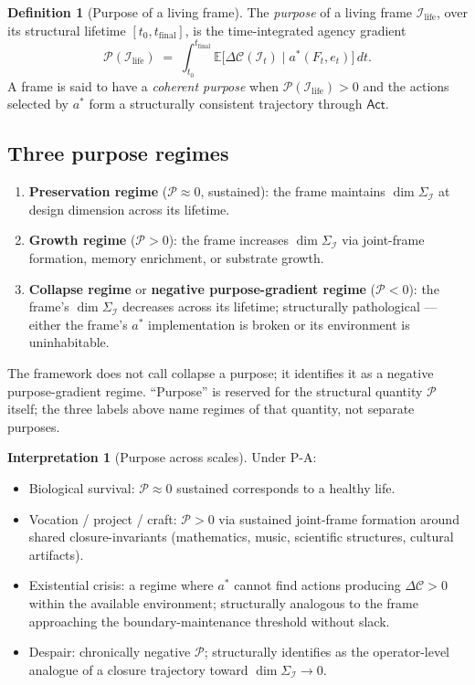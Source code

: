 \documentclass[11pt]{article}
\theoremstyle{plain}
\theoremstyle{definition}
\newtheorem{definition}[theorem]{Definition}
\newtheorem{interpretation}[theorem]{Interpretation}
\theoremstyle{remark}
\newcommand{\Ical}{\mathcal{I}}
\newcommand{\Ccal}{\mathcal{C}}
\newcommand{\Pcal}{\mathcal{P}}
\newcommand{\Ilife}{\Ical_{\mathrm{life}}}
\begin{document}
\begin{definition}[Purpose of a living frame]\label{def:purpose}
The \emph{purpose} of a living frame $\Ilife$, over its structural lifetime $[t_0, t_{\mathrm{final}}]$, is the time-integrated agency gradient
\[
  \Pcal(\Ilife) \;=\; \int_{t_0}^{t_{\mathrm{final}}} \mathbb{E}\big[ \Delta \Ccal(\Ical_t) \mid a^*(F_t, e_t) \big] \, dt.
\]
A frame is said to have a \emph{coherent purpose} when $\Pcal(\Ilife) > 0$ and the actions selected by $a^*$ form a structurally consistent trajectory through $\mathsf{Act}$.
\end{definition}

\subsection{Three purpose regimes}

\begin{enumerate}[leftmargin=2em]
\item \textbf{Preservation regime} ($\Pcal \approx 0$, sustained): the frame maintains $\dim \Sigma_\Ical$ at design dimension across its lifetime.
\item \textbf{Growth regime} ($\Pcal > 0$): the frame increases $\dim \Sigma_\Ical$ via joint-frame formation, memory enrichment, or substrate growth.
\item \textbf{Collapse regime} or \textbf{negative purpose-gradient regime} ($\Pcal < 0$): the frame's $\dim \Sigma_\Ical$ decreases across its lifetime; structurally pathological --- either the frame's $a^*$ implementation is broken or its environment is uninhabitable.
\end{enumerate}

\noindent The framework does not call collapse a purpose; it identifies it as a negative purpose-gradient regime. ``Purpose'' is reserved for the structural quantity $\Pcal$ itself; the three labels above name regimes of that quantity, not separate purposes.

\begin{interpretation}[Purpose across scales]\label{int:purpose}
Under P-A:
\begin{itemize}[leftmargin=2em]
\item Biological survival: $\Pcal \approx 0$ sustained corresponds to a healthy life.
\item Vocation / project / craft: $\Pcal > 0$ via sustained joint-frame formation around shared closure-invariants (mathematics, music, scientific structures, cultural artifacts).
\item Existential crisis: a regime where $a^*$ cannot find actions producing $\Delta \Ccal > 0$ within the available environment; structurally analogous to the frame approaching the boundary-maintenance threshold without slack.
\item Despair: chronically negative $\Pcal$; structurally identifies as the operator-level analogue of a closure trajectory toward $\dim \Sigma_\Ical \to 0$.
\end{itemize}
\end{interpretation}
\end{document}
